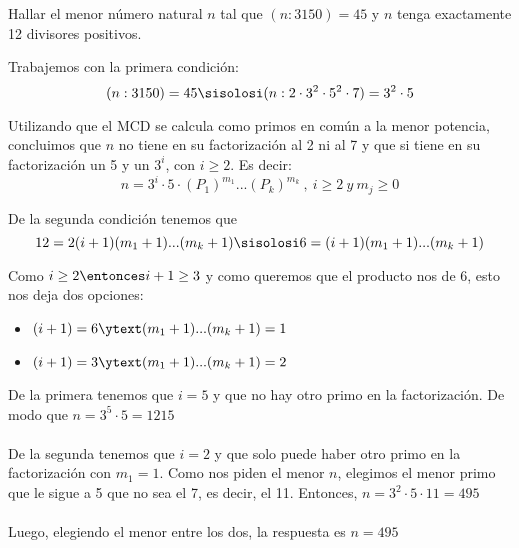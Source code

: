 \begin{enunciado}{\ejercicio}
        Hallar el menor número natural $n$ tal que $(n : 3150) = 45$ y $n$ tenga exactamente 12 divisores positivos.
\end{enunciado}

Trabajemos con la primera condición: 
\\
$$
(n:3150)=45
\sisolosi
(n:2\cdot3^{2}\cdot5^{2}\cdot7)=3^{2}\cdot5
$$


Utilizando que el MCD se calcula como primos en común a la menor potencia, concluimos que $n$ no tiene en su factorización al 2 ni al 7
y que si tiene en su factorización un 5 y un $3^{i}$, con $i \geq 2$. Es decir:
\\

$$
n = 3^{i}\cdot5\cdot(P_1)^{m_1}...(P_k)^{m_k} ~,~ i \geq 2 ~ y ~  m_j \geq 0 
$$

De la segunda condición tenemos que
\\
$$
12 =2(i+1)(m_1+1)...(m_k+1)
\sisolosi
6=(i+1)(m_1+1)...(m_k+1)
$$

Como  $i \geq 2 \entonces i+1 \geq 3$ y como queremos que el producto nos de 6, esto nos deja dos opciones:

\begin{itemize}
        \item $(i+1)= 6 \ytext (m_1+1)...(m_k+1)= 1$
        \item $(i+1)=3 \ytext (m_1+1)...(m_k+1)=2$
\end{itemize}

De la primera tenemos que $i=5$ y que no hay otro primo en la factorización. De modo que $n=3^{5}\cdot5=1215$
\\
\\
De la segunda tenemos que $i=2$ y que solo puede haber otro primo en la factorización con $m_1=1$.
Como nos piden el menor $n$, elegimos el menor primo que le sigue a 5 que no sea el 7, es decir, el 11. Entonces, $n=3^{2}\cdot5\cdot11=495$
\\
\\
Luego, elegiendo el menor entre los dos, la respuesta es $\boxed{n=495}$

\begin{aportes}
        \item {}
\end{aportes}